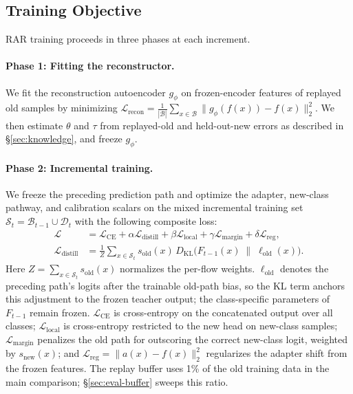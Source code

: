 \subsection{Training Objective}\label{sec:training}

RAR training proceeds in three phases at each increment.

\paragraph{Phase 1: Fitting the reconstructor.}
We fit the reconstruction autoencoder $g_\phi$ on frozen-encoder features of replayed old samples by minimizing $\mathcal{L}_{\mathrm{recon}} = \frac{1}{|\mathcal{B}|}\sum_{x \in \mathcal{B}} \|g_\phi(f(x)) - f(x)\|_2^2$. We then estimate $\theta$ and $\tau$ from replayed-old and held-out-new errors as described in \S\ref{sec:knowledge}, and freeze $g_\phi$.

\paragraph{Phase 2: Incremental training.}
We freeze the preceding prediction path and optimize the adapter, new-class pathway, and calibration scalars on the mixed incremental training set $\mathcal{S}_t=\mathcal{B}_{t-1}\cup\mathcal{D}_t$ with the following composite loss:
\begin{align}
\mathcal{L} &= \mathcal{L}_{\mathrm{CE}} + \alpha \mathcal{L}_{\mathrm{distill}} + \beta \mathcal{L}_{\mathrm{local}} + \gamma \mathcal{L}_{\mathrm{margin}} + \delta \mathcal{L}_{\mathrm{reg}},\label{eq:loss}\\[2pt]
\mathcal{L}_{\mathrm{distill}} &= \frac{1}{Z}\sum_{x \in \mathcal{S}_t} s_{\mathrm{old}}(x)\, D_{\mathrm{KL}}\bigl(F_{t-1}(x) \;\big\|\; \ell_{\mathrm{old}}(x)\bigr).\label{eq:distill}
\end{align}
Here $Z=\sum_{x\in\mathcal{S}_t}s_{\mathrm{old}}(x)$ normalizes the per-flow weights. $\ell_{\mathrm{old}}$ denotes the preceding path's logits after the trainable old-path bias, so the KL term anchors this adjustment to the frozen teacher output; the class-specific parameters of $F_{t-1}$ remain frozen. $\mathcal{L}_{\mathrm{CE}}$ is cross-entropy on the concatenated output over all classes; $\mathcal{L}_{\mathrm{local}}$ is cross-entropy restricted to the new head on new-class samples; $\mathcal{L}_{\mathrm{margin}}$ penalizes the old path for outscoring the correct new-class logit, weighted by $s_{\mathrm{new}}(x)$; and $\mathcal{L}_{\mathrm{reg}} = \|a(x) - f(x)\|_2^2$ regularizes the adapter shift from the frozen features. The replay buffer uses 1\% of the old training data in the main comparison; \S\ref{sec:eval-buffer} sweeps this ratio.

